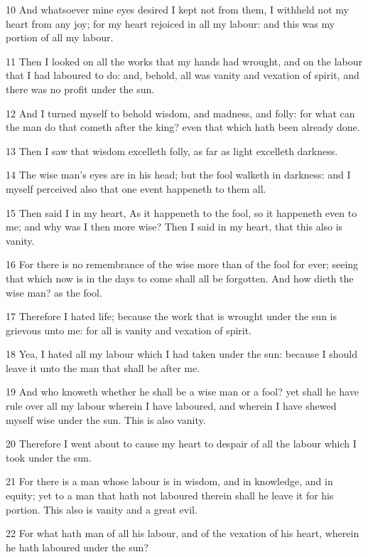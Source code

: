 \documentclass[12pt,twoside]{report}
\begin{document}
10 And whatsoever mine eyes desired I kept not from them, I
   withheld
   not my heart from any joy; for my heart rejoiced in all my labour:
   and
   this was my portion of all my labour.
   
11 Then I looked on all the works that my hands had wrought, and
   on
   the labour that I had laboured to do: and, behold, all was vanity
   and
   vexation of spirit, and there was no profit under the sun.
   
12 And I turned myself to behold wisdom, and madness, and folly:
   for
   what can the man do that cometh after the king? even that which
   hath
   been already done.
   
13 Then I saw that wisdom excelleth folly, as far as light
   excelleth
   darkness. 
   
14 The wise man's eyes are in his head; but the fool walketh in
   darkness: and I myself perceived also that one event happeneth to
   them
   all.
   
15 Then said I in my heart, As it happeneth to the fool, so it
   happeneth even to me; and why was I then more wise? Then I said in
   my
   heart, that this also is vanity.
   
16 For there is no remembrance of the wise more than of the fool
   for
   ever; seeing that which now is in the days to come shall all be
   forgotten. And how dieth the wise man? as the fool.
   
17 Therefore I hated life; because the work that is wrought under
   the sun is grievous unto me: for all is vanity and vexation of
   spirit.
   
18 Yea, I hated all my labour which I had taken under the sun:
   because I should leave it unto the man that shall be after me.
   
19 And who knoweth whether he shall be a wise man or a fool? yet
   shall he have rule over all my labour wherein I have laboured, and 
   wherein I have shewed myself wise under the sun. This is also
   vanity.
   
20 Therefore I went about to cause my heart to despair of all the
   labour which I took under the sun.
   
21 For there is a man whose labour is in wisdom, and in
   knowledge,  
   and in equity; yet to a man that hath not laboured therein shall he
   leave it for his portion. This also is vanity and a great evil.
   
22 For what hath man of all his labour, and of the vexation of
   his
   heart, wherein he hath laboured under the sun?
   
\end{document}
